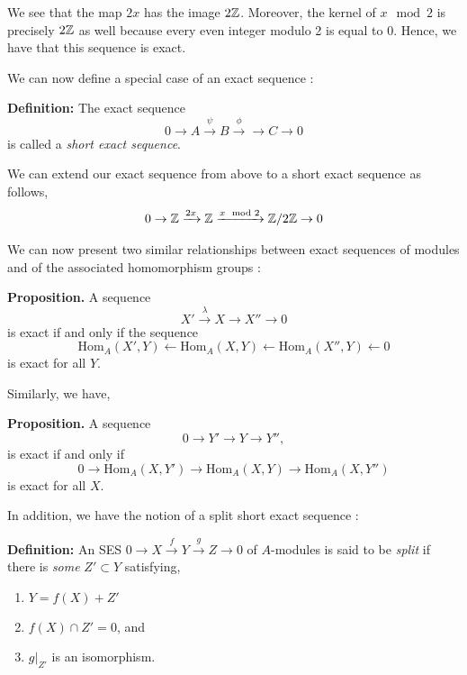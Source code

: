 \documentclass[11pt, reqno]{amsart}
\theoremstyle{plain}
\theoremstyle{definition}
\theoremstyle{example}
\def\Hom{\mathrm{Hom}}
\begin{document}
We see that the map $2x$ has the image $2\mathbb{Z}$. Moreover, the kernel of $x \mod 2$ is precisely $2\mathbb{Z}$ as well because every even integer modulo 2 is equal to $0$. Hence, we have that this sequence is exact.

\par
We can now define a special case of an exact sequence \cite[\S 10.5, p.379]{dummit}:

\par
\textbf{Definition:} The exact sequence $$0 \rightarrow A \xrightarrow{\psi} B \xrightarrow{\phi} \rightarrow C \rightarrow 0$$ is called a \textit{short exact sequence}.

\par
We can extend our exact sequence from above to a short exact sequence as follows,
\begin{align*}
0 \rightarrow \mathbb{Z} \xrightarrow{2x} \mathbb{Z} \xrightarrow{x \mod 2} \mathbb{Z}/2\mathbb{Z} \rightarrow 0
\end{align*}

\par
We can now present two similar relationships between exact sequences of modules and of the associated homomorphism groups \cite[\S 2.2, p. 122]{lang}:

\par
\textbf{Proposition.} A sequence 
$$X' \xrightarrow{\lambda} X \to X'' \to 0$$ is exact if and only if the sequence $$\Hom_A(X', Y) \leftarrow \Hom_A(X, Y) \leftarrow  \Hom_A(X'', Y) \leftarrow 0$$ is exact for all $Y$.

\par
Similarly, we have,

\par
\textbf{Proposition.} A sequence $$0 \rightarrow Y' \rightarrow Y \rightarrow Y'',$$ is exact if and only if $$0 \rightarrow \Hom_A(X, Y') \rightarrow \Hom_A(X, Y) \rightarrow \Hom_A(X, Y'')$$ is exact for all $X$.

\par
In addition, we have the notion of a split short exact sequence \cite[Lec 10, p.6]{dau}:

\newpage
\par
\textbf{Definition:} An SES $0 \rightarrow X \xrightarrow{f} Y \xrightarrow{g} Z \rightarrow 0$ of $A$-modules is said to be \textit{split} if there is \textit{some} $Z' \subset Y$ satisfying,
\begin{enumerate}
\item $Y = f(X) + Z'$
\item $f(X) \cap Z' = 0$, and
\item $g|_{Z'}$ is an isomorphism.
\end{enumerate}
\end{document}
